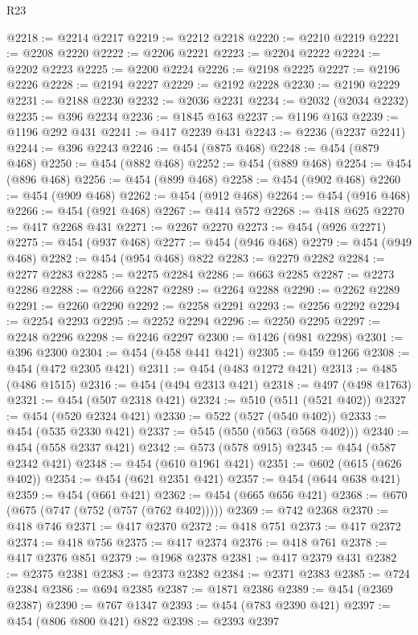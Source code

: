 \begin{lexlean}{R23}
\begin{coremodule}
@2218 := @2214 @2217
@2219 := @2212 @2218
@2220 := @2210 @2219
@2221 := @2208 @2220
@2222 := @2206 @2221
@2223 := @2204 @2222
@2224 := @2202 @2223
@2225 := @2200 @2224
@2226 := @2198 @2225
@2227 := @2196 @2226
@2228 := @2194 @2227
@2229 := @2192 @2228
@2230 := @2190 @2229
@2231 := @2188 @2230
@2232 := @2036 @2231
@2234 := @2032 (@2034 @2232)
@2235 := @396 @2234
@2236 := @1845 @163
@2237 := @1196 @163
@2239 := @1196 @292 @431
@2241 := @417 @2239 @431
@2243 := @2236 (@2237 @2241)
@2244 := @396 @2243
@2246 := @454 (@875 @468)
@2248 := @454 (@879 @468)
@2250 := @454 (@882 @468)
@2252 := @454 (@889 @468)
@2254 := @454 (@896 @468)
@2256 := @454 (@899 @468)
@2258 := @454 (@902 @468)
@2260 := @454 (@909 @468)
@2262 := @454 (@912 @468)
@2264 := @454 (@916 @468)
@2266 := @454 (@921 @468)
@2267 := @414 @572
@2268 := @418 @625
@2270 := @417 @2268 @431
@2271 := @2267 @2270
@2273 := @454 (@926 @2271)
@2275 := @454 (@937 @468)
@2277 := @454 (@946 @468)
@2279 := @454 (@949 @468)
@2282 := @454 (@954 @468) @822
@2283 := @2279 @2282
@2284 := @2277 @2283
@2285 := @2275 @2284
@2286 := @663 @2285
@2287 := @2273 @2286
@2288 := @2266 @2287
@2289 := @2264 @2288
@2290 := @2262 @2289
@2291 := @2260 @2290
@2292 := @2258 @2291
@2293 := @2256 @2292
@2294 := @2254 @2293
@2295 := @2252 @2294
@2296 := @2250 @2295
@2297 := @2248 @2296
@2298 := @2246 @2297
@2300 := @1426 (@981 @2298)
@2301 := @396 @2300
@2304 := @454 (@458 @441 @421)
@2305 := @459 @1266
@2308 := @454 (@472 @2305 @421)
@2311 := @454 (@483 @1272 @421)
@2313 := @485 (@486 @1515)
@2316 := @454 (@494 @2313 @421)
@2318 := @497 (@498 @1763)
@2321 := @454 (@507 @2318 @421)
@2324 := @510 (@511 (@521 @402))
@2327 := @454 (@520 @2324 @421)
@2330 := @522 (@527 (@540 @402))
@2333 := @454 (@535 @2330 @421)
@2337 := @545 (@550 (@563 (@568 @402)))
@2340 := @454 (@558 @2337 @421)
@2342 := @573 (@578 @915)
@2345 := @454 (@587 @2342 @421)
@2348 := @454 (@610 @1961 @421)
@2351 := @602 (@615 (@626 @402))
@2354 := @454 (@621 @2351 @421)
@2357 := @454 (@644 @638 @421)
@2359 := @454 (@661 @421)
@2362 := @454 (@665 @656 @421)
@2368 := @670 (@675 (@747 (@752 (@757 (@762 @402)))))
@2369 := @742 @2368
@2370 := @418 @746
@2371 := @417 @2370
@2372 := @418 @751
@2373 := @417 @2372
@2374 := @418 @756
@2375 := @417 @2374
@2376 := @418 @761
@2378 := @417 @2376 @851
@2379 := @1968 @2378
@2381 := @417 @2379 @431
@2382 := @2375 @2381
@2383 := @2373 @2382
@2384 := @2371 @2383
@2385 := @724 @2384
@2386 := @694 @2385
@2387 := @1871 @2386
@2389 := @454 (@2369 @2387)
@2390 := @767 @1347
@2393 := @454 (@783 @2390 @421)
@2397 := @454 (@806 @800 @421) @822
@2398 := @2393 @2397

\end{coremodule}
\end{lexlean}
